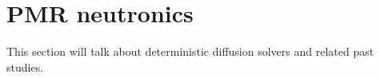 \section{PMR neutronics}

This section will talk about deterministic diffusion solvers and related past studies.